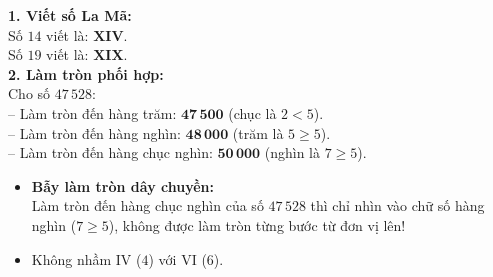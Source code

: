 \documentclass[11pt,a4paper]{article}
\begin{document}
\vspace{-2.5mm}
\noindent
\begin{minipage}[t]{0.49\textwidth}\vspace{0pt}
\begin{tcolorbox}[
  enhanced,
  colback=green!4!white,
  colframe=green!60!black,
  arc=2mm, boxrule=0.8pt,
  left=2mm, right=2mm, top=1.8mm, bottom=1.8mm,
  title={\footnotesize\bfseries\color{white}\faCheckCircle\ Ví dụ thực hành chuẩn mực}
]
{\footnotesize
\textbf{1. Viết số La Mã:}\\
Số $14$ viết là: $\mathbf{\text{XIV}}$.\\
Số $19$ viết là: $\mathbf{\text{XIX}}$.\\
\textbf{2. Làm tròn phối hợp:}\\
Cho số $47\,528$:\\
-- Làm tròn đến hàng trăm: $\mathbf{47\,500}$ (chục là $2 < 5$).\\
-- Làm tròn đến hàng nghìn: $\mathbf{48\,000}$ (trăm là $5 \ge 5$).\\
-- Làm tròn đến hàng chục nghìn: $\mathbf{50\,000}$ (nghìn là $7 \ge 5$).
}
\end{tcolorbox}
\end{minipage}
\hfill
\begin{minipage}[t]{0.49\textwidth}\vspace{0pt}
\begin{tcolorbox}[
  enhanced,
  colback=red!4!white,
  colframe=red!70!black,
  arc=2mm, boxrule=0.8pt,
  left=2mm, right=2mm, top=1.8mm, bottom=1.8mm,
  title={\footnotesize\bfseries\color{white}\faExclamationTriangle\ Mẹo tránh bẫy trắc nghiệm}
]
{\footnotesize
\begin{itemize}\setlength{\itemsep}{1.5pt}\setlength{\leftskip}{-2.5mm}
  \item \textbf{Bẫy làm tròn dây chuyền:}\\
  Làm tròn đến hàng chục nghìn của số $47\,528$ thì chỉ nhìn vào chữ số hàng nghìn ($7 \ge 5$), không được làm tròn từng bước từ đơn vị lên!
  \item Không nhầm $\text{IV}$ ($4$) với $\text{VI}$ ($6$).
\end{itemize}
}
\end{tcolorbox}
\end{minipage}
\end{document}
